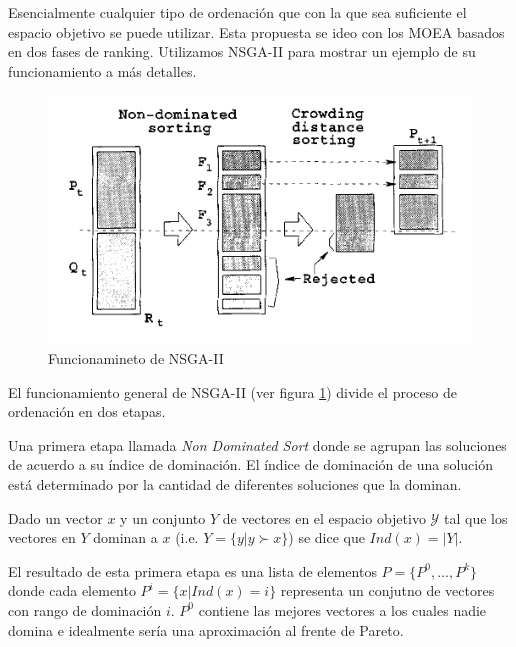 Esencialmente cualquier tipo de ordenaci\'on que con la que sea suficiente el espacio objetivo se puede utilizar. Esta propuesta se ideo con los MOEA basados en dos fases de ranking. Utilizamos NSGA-II para mostrar un ejemplo de su funcionamiento a m\'as detalles.


\begin{figure}[ht]
    \centering
    \includegraphics[scale=0.5]{Pictures/nsga2.png}
    \caption{Funcionamineto de NSGA-II}
    \label{proposal:fig:nsga2}
\end{figure}

El funcionamiento general de NSGA-II (ver figura \ref{proposal:fig:nsga2}) divide el proceso de ordenaci\'on en dos etapas.

Una primera etapa llamada \textit{Non Dominated Sort} donde se agrupan las soluciones de acuerdo a su \'indice de dominaci\'on. El \'indice de dominaci\'on de una soluci\'on est\'a determinado por la cantidad de diferentes soluciones que la dominan.
\begin{definition}
    \label{proposal:def:domination_index}
    Dado un vector $x$ y un conjunto $Y$ de vectores en el espacio objetivo $\mathcal{Y}$ tal que los vectores en $Y$ dominan a $x$ (i.e. $Y = \{y | y \succ x\}$) se dice que $Ind(x) = |Y|$.
\end{definition}
El resultado de esta primera etapa es una lista de elementos $P = \{P^0, ..., P^k\}$ donde cada elemento $P^i = \{x | Ind(x) = i\}$ representa un conjutno de vectores con rango de dominaci\'on $i$. $P^0$ contiene las mejores vectores a los cuales nadie domina e idealmente ser\'ia una aproximaci\'on al frente de Pareto.

